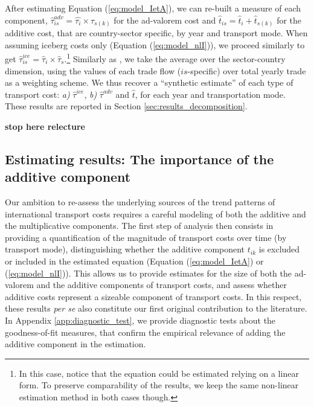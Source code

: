\documentclass[a4paper,11pt]{article}
\begin{document}


After estimating Equation (\ref{eq:model_IetA}), we can re-built a measure of each component, $\widehat{\tau}^{adv}_{is} = \widehat{\tau_{i}} \times \widehat{\tau}_{s(k)}$ for the ad-valorem cost and $\widehat{t}_{is} = \widehat{t}_{i} + \widehat{t}_{s(k)}$ for the additive cost, that are country-sector specific, by year and transport mode. When assuming iceberg costs only (Equation (\ref{eq:model_nlI})), we proceed similarly to get $\widehat{\tau}^{ice}_{is} = \widehat{\tau}_{i} \times \widehat{\tau}_{s}$.\footnote{In this case, notice that the equation could be estimated relying on a linear form. To preserve comparability of the results, we keep the same non-linear estimation method in both cases though.} Similarly as \citet{Irrazabal_2015}, we take the average over the sector-country dimension, using the values of each trade flow ($is$-specific) over total yearly trade as a weighting scheme. We thus recover a ``synthetic estimate'' of each type of transport cost: \textit{a)} $\widehat{\tau}^{ice}$, \textit{b)} $\widehat{\tau}^{adv}$ and $\widehat{t}$, for each year and transportation mode. These results are reported in Section \ref{sec:results_decomposition}.

\textbf{stop here relecture}

\subsection{Estimating results: The importance of the additive component \label{sec:results_decomposition}}

Our ambition to re-assess the underlying sources of the trend patterns of international transport costs requires a careful modeling of both the additive and the multiplicative components. The first step of analysis then consists in providing a quantification of the magnitude of transport costs over time (by transport mode), distinguishing whether the additive component $t_{ik}$ is excluded or included in the estimated equation (Equation (\ref{eq:model_IetA}) or (\ref{eq:model_nlI})). This allows us to provide estimates for the size of both the ad-valorem and the additive components of transport costs, and assess whether additive costs represent a sizeable component of transport costs. In this respect, these results \textit{per se} also constitute our first original contribution to the literature. In Appendix \ref{app:diagnostic_test}, we provide diagnostic tests about the goodness-of-fit measures, that confirm the empirical relevance of adding the additive component in the estimation.\smallskip
\end{document}
